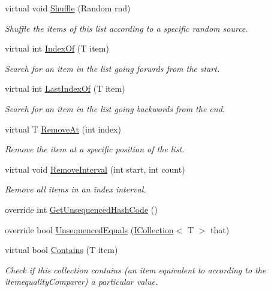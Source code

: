\begin{DoxyCompactItemize}
virtual void \hyperlink{class_c5_1_1_hashed_array_list_a8cb8a5ae24eddc8d343ef054b0f86dcd}{Shuffle} (Random rnd)
\begin{DoxyCompactList}\small\item\em Shuffle the items of this list according to a specific random source. \end{DoxyCompactList}\item 
virtual int \hyperlink{class_c5_1_1_hashed_array_list_a6d13105e7f303fc04310801abed22946}{Index\+Of} (T item)
\begin{DoxyCompactList}\small\item\em Search for an item in the list going forwrds from the start. \end{DoxyCompactList}\item 
virtual int \hyperlink{class_c5_1_1_hashed_array_list_a6fff76a2253ec4f3fb52abcddecbc52c}{Last\+Index\+Of} (T item)
\begin{DoxyCompactList}\small\item\em Search for an item in the list going backwords from the end. \end{DoxyCompactList}\item 
virtual T \hyperlink{class_c5_1_1_hashed_array_list_a28dadd5b31e5daa8eb34728f0c31728a}{Remove\+At} (int index)
\begin{DoxyCompactList}\small\item\em Remove the item at a specific position of the list. \end{DoxyCompactList}\item 
virtual void \hyperlink{class_c5_1_1_hashed_array_list_ab443d1ea4dd141b18debf8d450deb2fb}{Remove\+Interval} (int start, int count)
\begin{DoxyCompactList}\small\item\em Remove all items in an index interval. \end{DoxyCompactList}\item 
override int \hyperlink{class_c5_1_1_hashed_array_list_a8f23bbdc50d2c951e19fad0008f2f25a}{Get\+Unsequenced\+Hash\+Code} ()
\item 
override bool \hyperlink{class_c5_1_1_hashed_array_list_a6ed6c87e49b97c50d2cafba6fe050b26}{Unsequenced\+Equals} (\hyperlink{interface_c5_1_1_i_collection}{I\+Collection}$<$ T $>$ that)
\item 
virtual bool \hyperlink{class_c5_1_1_hashed_array_list_a4b108299a930ceaecd8484023a656cf4}{Contains} (T item)
\begin{DoxyCompactList}\small\item\em Check if this collection contains (an item equivalent to according to the itemequality\+Comparer) a particular value. \end{DoxyCompactList}\item 

\end{DoxyCompactItemize}

